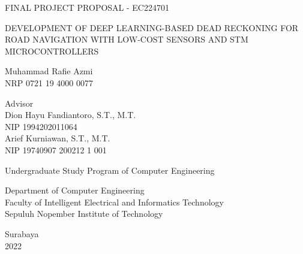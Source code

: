 \begin{large}
  FINAL PROJECT PROPOSAL - EC224701
\end{large}

\vspace{\fill}

\begin{spacing}{1.5}
  \begin{Large}
    DEVELOPMENT OF DEEP LEARNING-BASED DEAD RECKONING 
    FOR ROAD NAVIGATION 
    WITH LOW-COST SENSORS AND STM MICROCONTROLLERS
  \end{Large}
\end{spacing}

\vspace{\fill}

\begin{large}
  Muhammad Rafie Azmi \\
  \textmd{NRP 0721 19 4000 0077}
\end{large}

\vspace{\fill}

\begin{large}
  \textmd{Advisor} \\
  Dion Hayu Fandiantoro, S.T., M.T. \\
  \textmd{NIP 1994202011064} \\
  Arief Kurniawan, S.T., M.T. \\
  \textmd{NIP 19740907 200212 1 001}
\end{large}

\vspace{\fill}

Undergraduate Study Program of Computer Engineering \\

\mdseries

Department of Computer Engineering \\
Faculty of Intelligent Electrical and Informatics Technology \\
Sepuluh Nopember Institute of Technology

Surabaya \\
2022

